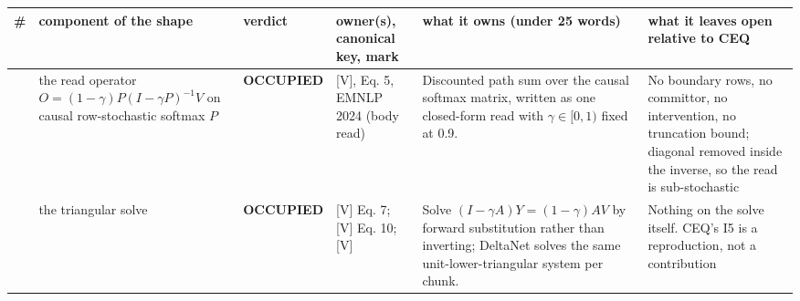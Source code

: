 \documentclass[11pt,a4paper]{article}
\newcounter{none}                 %
\theoremstyle{plain}
\theoremstyle{definition}
\theoremstyle{remark}
\begin{document}
{\def\LTcaptype{none} %
\begin{longtable}[]{@{}
  >{\raggedright\arraybackslash}p{}
  >{\raggedright\arraybackslash}p{}
  >{\raggedright\arraybackslash}p{}
  >{\raggedright\arraybackslash}p{}
  >{\raggedright\arraybackslash}p{}
  >{\raggedright\arraybackslash}p{}@{}}
\toprule\noalign{}
\begin{minipage}[b]{\linewidth}\raggedright
\#
\end{minipage} & \begin{minipage}[b]{\linewidth}\raggedright
component of the shape
\end{minipage} & \begin{minipage}[b]{\linewidth}\raggedright
verdict
\end{minipage} & \begin{minipage}[b]{\linewidth}\raggedright
owner(s), canonical key, mark
\end{minipage} & \begin{minipage}[b]{\linewidth}\raggedright
what it owns (under 25 words)
\end{minipage} & \begin{minipage}[b]{\linewidth}\raggedright
what it leaves open relative to CEQ
\end{minipage} \\
\midrule\noalign{}
\endhead
\bottomrule\noalign{}
\endlastfoot
1 & the read operator \(O=(1-\gamma)P(I-\gamma P)^{-1}V\) on causal
row-stochastic softmax \(P\) & \textbf{OCCUPIED} &
\citep{fagnou-2024-chacal} {[}V{]}, Eq. 5, EMNLP 2024 (body read) &
Discounted path sum over the causal softmax matrix, written as one
closed-form read with \(\gamma\in[0,1)\) fixed at 0.9. & No boundary
rows, no committor, no intervention, no truncation bound; diagonal
removed inside the inverse, so the read is sub-stochastic \\
2 & the triangular solve & \textbf{OCCUPIED} &
\citep{fagnou-2024-chacal} {[}V{]} Eq. 7; \citep{yang-2024-deltanet}
{[}V{]} Eq. 10; \citep{zhao-2026-structuredsparse} {[}V{]} & Solve
\((I-\gamma A)Y=(1-\gamma)AV\) by forward substitution rather than
inverting; DeltaNet solves the same unit-lower-triangular system per
chunk. & Nothing on the solve itself. CEQ's I5 is a reproduction, not a
contribution \\

\end{longtable}}
\end{document}
